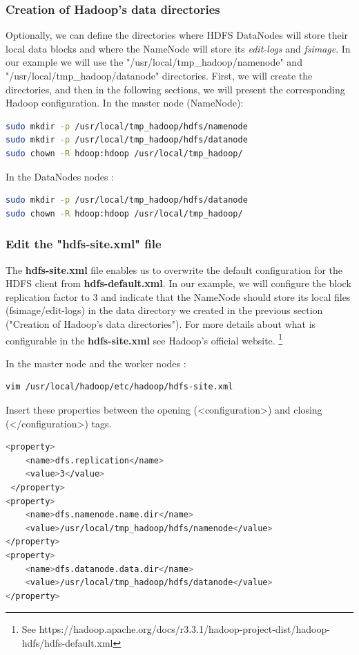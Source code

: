 \documentclass[12pt,english]{book}
\begin{document}
\subsubsection{Creation of Hadoop's data directories}

Optionally, we can define the directories where HDFS DataNodes will store their local data blocks and where the NameNode will store its \textit{edit-logs} and \textit{fsimage}.
In our example we will use the "/usr/local/tmp\_hadoop/namenode" and "/usr/local/tmp\_hadoop/datanode" directories.
First, we will create the directories, and then in the following sections, we will present the corresponding Hadoop configuration. 
In the master node (NameNode):
\begin{lstlisting}[language=bash, frame=single, basicstyle=\footnotesize]
sudo mkdir -p /usr/local/tmp_hadoop/hdfs/namenode
sudo mkdir -p /usr/local/tmp_hadoop/hdfs/datanode
sudo chown -R hdoop:hdoop /usr/local/tmp_hadoop/
\end{lstlisting}
In the DataNodes nodes :
\begin{lstlisting}[language=bash, frame=single, basicstyle=\footnotesize]
sudo mkdir -p /usr/local/tmp_hadoop/hdfs/datanode
sudo chown -R hdoop:hdoop /usr/local/tmp_hadoop/
\end{lstlisting}


\subsubsection{Edit the "hdfs-site.xml" file}


The \textbf{hdfs-site.xml} file enables us to overwrite the default configuration for the HDFS client from \textbf{hdfs-default.xml}.
In our example, we will configure the block replication factor to 3 and indicate that the NameNode should store its local files (fsimage/edit-logs) in the data directory we created in the previous section ("Creation of Hadoop's data directories").
For more details about what is configurable in the \textbf{hdfs-site.xml} see Hadoop's official website.
\footnote{See https://hadoop.apache.org/docs/r3.3.1/hadoop-project-dist/hadoop-hdfs/hdfs-default.xml}

In the master node and the worker nodes :
\begin{lstlisting}[language=bash, frame=single, basicstyle=\footnotesize]
vim /usr/local/hadoop/etc/hadoop/hdfs-site.xml 
\end{lstlisting}
Insert these properties between the opening (<configuration>) and closing (</configuration>) tags.
\begin{lstlisting}[language=bash, frame=single, basicstyle=\footnotesize]
<property>
	<name>dfs.replication</name>
	<value>3</value>
 </property>
<property>
	<name>dfs.namenode.name.dir</name>
	<value>/usr/local/tmp_hadoop/hdfs/namenode</value>
</property>
<property>
	<name>dfs.datanode.data.dir</name>
	<value>/usr/local/tmp_hadoop/hdfs/datanode</value>
</property>
\end{lstlisting}
\end{document}
